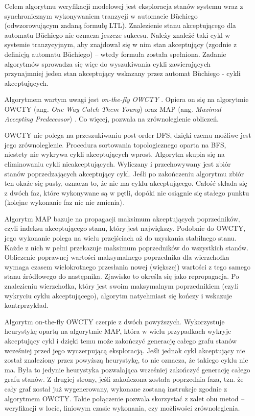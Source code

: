 Celem algorytmu weryfikacji modelowej jest eksploracja stanów systemu wraz z synchronicznym wykonywaniem tranzycji w automacie Büchiego (odwzorowującym zadaną formułę LTL).
Znalezienie stanu akceptującego dla automatu Büchiego nie oznacza jeszcze sukcesu.
Należy znaleźć taki cykl w systemie tranzycyjnym, aby znajdował się w nim stan akceptujący (zgodnie z definicją automatu Büchiego) -- wtedy formuła została spełniona.
Zadanie algorytmów sprowadza się więc do wyszukiwania cykli zawierających przynajmniej jeden stan akceptujący wskazany przez automat Büchiego - cykli akceptujących.

Algorytmem wartym uwagi jest \textit{on-the-fly OWCTY} \cite{Bar12}.
Opiera on się na algorytmie OWCTY (ang. \textit{One Way Catch Them Young}) \cite{Cer03} oraz MAP (ang. \textit{Maximal Accepting Predecessor}) \cite{Bri04}.
Co więcej, pozwala na zrównoleglenie obliczeń.

OWCTY nie polega na przeszukiwaniu post-order DFS, dzięki czemu możliwe jest jego zrównoleglenie.
Procedura sortowania topologicznego oparta na BFS, niestety nie wykrywa cykli akceptujących wprost.
Algorytm skupia się na eliminowaniu cykli nieakceptujących. 
Wyliczany i przechowywany jest zbiór stanów poprzedzających akceptujący cykl.
Jeśli po zakończeniu algorytmu zbiór ten okaże się pusty, oznacza to, że nie ma cyklu akceptującego.
Całość składa się z dwóch faz, które wykonywane są w pętli, dopóki nie osiągnie się stałego punktu (kolejne wykonanie faz nic nie zmienia).

Algorytm MAP bazuje na propagacji maksimum akceptujących poprzedników, czyli indeksu akceptującego stanu, który jest największy.
Podobnie do OWCTY, jego wykonanie polega na wielu przejściach aż do uzyskania stabilnego stanu.
Każde z nich w pełni przekazuje maksimum poprzedników do wszystkich stanów.
Obliczenie poprawnej wartości maksymalnego poprzednika dla wierzchołka wymaga czasem wielokrotnego przesłania nowej (większej) wartości z tego samego stanu źródłowego do następnika.
Zjawisko to określa się jako repropagacja.
Po znalezieniu wierzchołka, który jest swoim maksymalnym poprzednikiem (czyli wykryciu cyklu akceptującego), algorytm natychmiast się kończy i wskazuje kontrprzykład.

Algorytm on-the-fly OWCTY czerpie z dwóch powyższych.
Wykorzystuje heurystykę opartą na algorytmie MAP, która w wielu przypadkach wykryje akceptujący cykl i dzięki temu może zakończyć generację całego grafu stanów wcześniej przed jego wyczerpującą eksploracją.
Jeśli jednak cykl akceptujący nie został znaleziony przez powyższą heurystykę, to nie oznacza, że takiego cyklu nie ma.
Była to jedynie heurystyka pozwalająca wcześniej zakończyć generację całego grafu stanów.
Z drugiej strony, jeśli zakończona została poprzednia faza, tzn. że cały graf został już wygenerowany, wykonane zostaną instrukcje zgodnie z algorytmem OWCTY.
Takie połączenie pozwala skorzystać z zalet obu metod -- weryfikacji w locie, liniowym czasie wykonania, czy możliwości zrównoleglenia.

